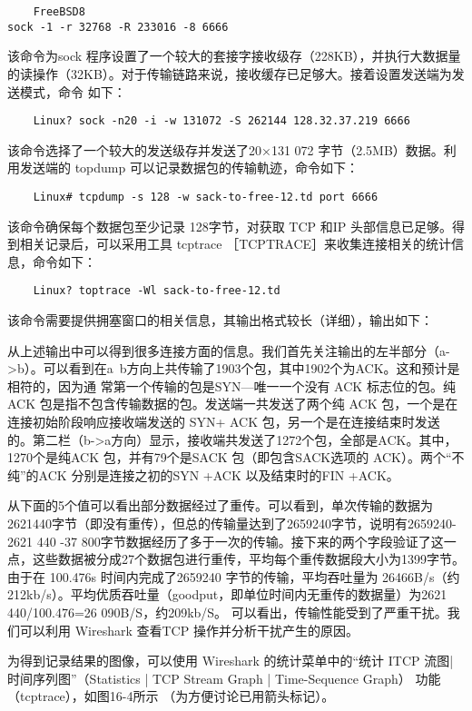 \begin{verbatim}
    FreeBSD8
sock -1 -r 32768 -R 233016 -8 6666
\end{verbatim}

该命令为sock 程序设置了一个较大的套接字接收级存（228KB），并执行大数据量的读操作（32KB）。对于传输链路来说，接收缓存已足够大。接着设置发送端为发送模式，命令
如下：

\begin{verbatim}
    Linux? sock -n20 -i -w 131072 -S 262144 128.32.37.219 6666
\end{verbatim}

该命令选择了一个较大的发送级存并发送了20×131 072 字节（2.5MB）数据。利用发送端的 topdump 可以记录数据包的传输軌迹，命令如下：
\begin{verbatim}
    Linux# tcpdump -s 128 -w sack-to-free-12.td port 6666
\end{verbatim}

该命令确保每个数据包至少记录 128字节，对获取 TCP 和IP 头部信息已足够。得到相关记录后，可以采用工具 tcptrace ［TCPTRACE］来收集连接相关的统计信息，命令如下：
\begin{verbatim}
    Linux? toptrace -Wl sack-to-free-12.td
\end{verbatim}
该命令需要提供拥塞窗口的相关信息，其输出格式较长（详细），输出如下：

从上述输出中可以得到很多连接方面的信息。我们首先关注输出的左半部分（a->b）。可以看到在a~b方向上共传输了1903个包，其中1902个为ACK。这和预计是相符的，因为通
常第一个传输的包是SYN—唯一一个没有 ACK 标志位的包。纯ACK 包是指不包含传输数据的包。发送端一共发送了两个纯 ACK 包，一个是在连接初始阶段响应接收端发送的 SYN+
ACK 包，另一个是在连接结束时发送的。第二栏（b->a方向）显示，接收端共发送了1272个包，全部是ACK。其中，1270个是纯ACK 包，并有79个是SACK 包（即包含SACK选项的
ACK）。两个“不纯”的ACK 分别是连接之初的SYN +ACK 以及结束时的FIN +ACK。

从下面的5个值可以看出部分数据经过了重传。可以看到，单次传输的数据为2621440字节（即没有重传），但总的传输量达到了2659240字节，说明有2659240-
2621 440 -37 800字节数据经历了多于一次的传输。接下来的两个字段验证了这一点，这些数据被分成27个数据包进行重传，平均每个重传数据段大小为1399字节。由于在 100.476s
时间内完成了2659240 字节的传输，平均吞吐量为 26466B/s（约212kb/s）。平均优质吞吐量（goodput，即单位时间内无重传的数据量）为2621 440/100.476=26 090B/S，约209kb/S。
可以看出，传输性能受到了严重干扰。我们可以利用 Wireshark 查看TCP 操作并分析干扰产生的原因。

为得到记录结果的图像，可以使用 Wireshark 的统计菜单中的“统计 ITCP 流图| 时间序列图”（Statistics | TCP Stream Graph | Time-Sequence Graph） 功能（tcptrace），如图16-4所示
（为方便讨论已用箭头标记）。

